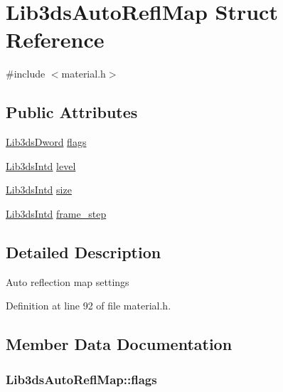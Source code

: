 \hypertarget{struct_lib3ds_auto_refl_map}{\section{Lib3ds\-Auto\-Refl\-Map Struct Reference}
\label{struct_lib3ds_auto_refl_map}
}


{\ttfamily \#include $<$material.\-h$>$}

\subsection*{Public Attributes}
\begin{DoxyCompactItemize}
\item 
\hyperlink{types_8h_a299c9663303144c562f6bd92c2f273d3}{Lib3ds\-Dword} \hyperlink{struct_lib3ds_auto_refl_map_a357a2ed71028fb3412b18e4c273044d3}{flags}
\item 
\hyperlink{types_8h_a5d92ad41149cf040ce2ee32cc2609403}{Lib3ds\-Intd} \hyperlink{struct_lib3ds_auto_refl_map_ac4a9724ab4078b5e189cfb8f776ff821}{level}
\item 
\hyperlink{types_8h_a5d92ad41149cf040ce2ee32cc2609403}{Lib3ds\-Intd} \hyperlink{struct_lib3ds_auto_refl_map_a8e9b42171de7234d7dff6b0f3be98851}{size}
\item 
\hyperlink{types_8h_a5d92ad41149cf040ce2ee32cc2609403}{Lib3ds\-Intd} \hyperlink{struct_lib3ds_auto_refl_map_a30446ee5fc22a8b5f0b958026b2c66c9}{frame\-\_\-step}
\end{DoxyCompactItemize}


\subsection{Detailed Description}
Auto reflection map settings 

Definition at line 92 of file material.\-h.



\subsection{Member Data Documentation}
\hypertarget{struct_lib3ds_auto_refl_map_a357a2ed71028fb3412b18e4c273044d3}{
\subsubsection[{flags}]{ Lib3ds\-Auto\-Refl\-Map\-::flags}}\label{struct_lib3ds_auto_refl_map_a357a2ed71028fb3412b18e4c273044d3}


